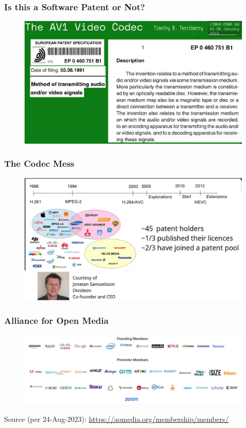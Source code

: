 \documentclass[aspectratio=169, xcolor=table, notheorems, hyperref={pdfpagelabels=false}]{beamer}
\begin{document}
\begin{frame}
\frametitle{Is this a Software Patent or Not?}
\begin{figure}
\includegraphics[width=0.75\linewidth]{os01-avw}
\end{figure}
\end{frame}

\begin{frame}
\frametitle{The Codec Mess}
\begin{figure}
\includegraphics[width=0.75\linewidth]{os01-avx}
\end{figure}
\end{frame}

\begin{frame}
\frametitle{Alliance for Open Media}
\begin{figure}
\includegraphics[width=0.99\linewidth]{os01-avy}
\end{figure}
{\small Source (per 24-Aug-2023): \url{https://aomedia.org/membership/members/}}
\end{frame}
\end{document}
